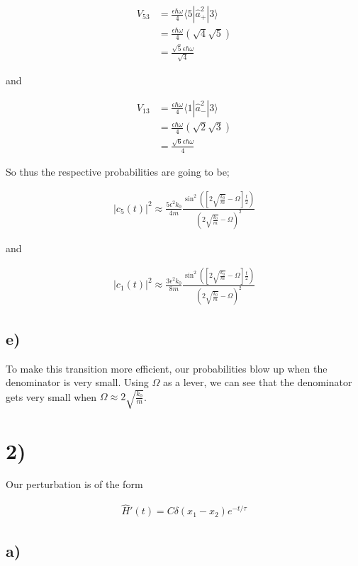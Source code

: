 \documentclass{article}
\newcommand{\p}[1]{\left(#1\right)}
\newcommand{\braket}[1]{\langle#1\rangle}
\begin{document}
\begin{align*}
    V_{53}&=\frac{\epsilon\hbar\omega}{4}\braket{5|\hat{a}_{+}^2|3}\\[1em]
    &=\frac{\epsilon\hbar\omega}{4}\p{\sqrt{4}\sqrt{5}}\\[1em]
    &=\frac{\sqrt{5}\epsilon\hbar\omega}{\sqrt4}
\end{align*}

and 

\begin{align*}
    V_{13}&=\frac{\epsilon\hbar\omega}{4}\braket{1|\hat{a}_{-}^{2}|3}\\[1em]
    &=\frac{\epsilon\hbar\omega}{4}\p{\sqrt{2}\sqrt{3}}\\[1em]
    &=\frac{\sqrt{6}\epsilon\hbar\omega}{4}
\end{align*}

So thus the respective probabilities are going to be;

\begin{align*}
    |c_5(t)|^2\approx\frac{5\epsilon^{2}{k_0}}{4m}\frac{\sin^2\p{[2\sqrt{\frac{k_0}{m}}-\Omega]\frac{t}{2}}}{\p{2\sqrt{\frac{k_0}{m}}-\Omega}^2}
\end{align*}

and

\begin{align*}
    |c_{1}(t)|^2\approx\frac{3\epsilon^2k_0}{8m}\frac{\sin^2\p{[2\sqrt{\frac{k_0}{m}}-\Omega]\frac{t}{2}}}{\p{2\sqrt{\frac{k_0}{m}}-\Omega}^2}
\end{align*}

\subsection*{e)}

To make this transition more efficient, our probabilities blow up when the denominator is very small. Using $\Omega$ as a lever, we can see that the denominator gets very small when $\Omega\approx2\sqrt{\frac{k_0}{m}}$.

\section*{2)}

Our perturbation is of the form

\begin{align*}
    \hat{H}'(t)=C\delta(x_1-x_2)e^{-t/\tau}
\end{align*}

\subsection*{a)}
\end{document}
